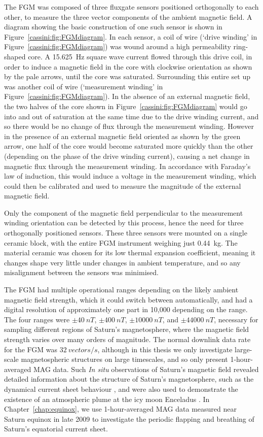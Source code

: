 The FGM was composed of three fluxgate sensors positioned orthogonally to each other, to measure the three vector components of the ambient magnetic field. A diagram showing the basic construction of one such sensor is shown in Figure~\ref{cassini:fig:FGMdiagram}. In each sensor, a coil of wire (`drive winding' in Figure~\ref{cassini:fig:FGMdiagram}) was wound around a high permeability ring-shaped core. A \SI{15.625}{\hertz} square wave current flowed through this drive coil, in order to induce a magnetic field in the core with clockwise orientation as shown by the pale arrows, until the core was saturated. Surrounding this entire set up was another coil of wire (`measurement winding' in Figure~\ref{cassini:fig:FGMdiagram}). In the absence of an external magnetic field, the two halves of the core shown in Figure~\ref{cassini:fig:FGMdiagram} would go into and out of saturation at the same time due to the drive winding current, and so there would  be no change of  flux through the measurement winding. However in the presence of an external magnetic field  oriented as shown by  the green arrow, one half of the core would become saturated more quickly than the other (depending on the phase of the drive winding current), causing a net change in magnetic flux through the measurement winding. In accordance with Faraday's law of  induction, this  would induce a voltage in  the measurement winding,  which could then be calibrated and used to measure the magnitude  of the external magnetic field. 

Only the component of the magnetic field perpendicular to the measurement winding orientation can be detected by this process, hence the need for three orthogonally positioned sensors. These three sensors were mounted on a single ceramic block, with the entire FGM  instrument  weighing just \SI{0.44}{kg}. The material ceramic was chosen for its low thermal expansion coefficient,  meaning  it changes shape very little under  changes in ambient temperature, and so any misalignment between the sensors was minimised.

The FGM had multiple operational ranges depending on the likely ambient magnetic field strength, which it could switch between automatically, and had a digital resolution of approximately one part in 10,000 depending on the range. The four ranges were $\pm\SI{40}{nT}$, $\pm\SI{400}{nT}$, $\pm\SI{10000}{nT}$, and $\pm\SI{44000}{nT}$, necessary for sampling different regions of Saturn's magnetosphere, where the magnetic  field strength  varies over many orders of magnitude. The normal downlink data rate for the FGM was $\SI{32}{vectors/s}$, although in this thesis we only investigate large-scale magnetospheric structures on large timescales, and so only present 1-hour-averaged MAG data. Such \textit{In situ} observations of Saturn's magnetic field revealed detailed information about the structure of Saturn's magnetosphere, such as the dynamical current sheet behaviour \citep[e.g.][]{provan2012}, and were also used to demonstrate the existence of an atmospheric plume at the icy moon Enceladus \citep{dougherty2006}. In Chapter~\ref{chap:equinox}, we use 1-hour-averaged MAG data measured near Saturn equinox in late 2009 to investigate the periodic flapping and breathing of Saturn's equatorial current sheet.

